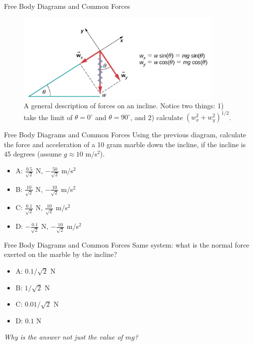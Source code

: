 \documentclass{beamer}
\begin{document}
\begin{frame}{Free Body Diagrams and Common Forces}
\begin{figure}
\centering
\includegraphics[width=0.9\textwidth]{figures/incline2.png}
\caption{\label{fig:incline2} A general description of forces on an incline.  Notice two things: 1) take the limit of $\theta = 0^{\circ}$ and $\theta = 90^{\circ}$, and 2) calculate $(w_x^2+w_y^2)^{1/2}$.}
\end{figure}
\end{frame}

\begin{frame}{Free Body Diagrams and Common Forces}
Using the previous diagram, calculate the force and acceleration of a 10 gram marble down the incline, if the incline is 45 degrees (assume $g \approx 10$ m/s$^2$).
\begin{itemize}
\item A: $\frac{0.5}{\sqrt{2}}$ N, $-\frac{50}{\sqrt{2}}$ m/s$^2$
\item B: $\frac{10}{\sqrt{2}}$ N, $-\frac{10}{\sqrt{2}}$ m/s$^2$
\item C: $\frac{0.1}{\sqrt{2}}$ N, $\frac{10}{\sqrt{2}}$ m/s$^2$
\item D: $-\frac{0.1}{\sqrt{2}}$ N, $-\frac{10}{\sqrt{2}}$ m/s$^2$
\end{itemize}
\end{frame}

\begin{frame}{Free Body Diagrams and Common Forces}
Same system: what is the normal force exerted on the marble by the incline?
\begin{itemize}
\item A: $0.1/\sqrt{2}$ N
\item B: $1/\sqrt{2}$ N
\item C: $0.01/\sqrt{2}$ N
\item D: $0.1$ N
\end{itemize}
\textit{Why is the answer not just the value of $mg$?}
\end{frame}
\end{document}
